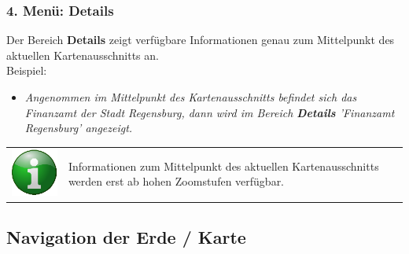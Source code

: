 \documentclass[10pt]{scrreprt}
\begin{document}
\subsubsection{4. Menü: Details} 
Der Bereich \textbf{Details} zeigt verfügbare Informationen genau zum Mittelpunkt des aktuellen Kartenausschnitts an.\\

Beispiel:
\begin{itemize}
\item \textit{Angenommen im Mittelpunkt des Kartenausschnitts befindet sich das Finanzamt der Stadt Regensburg, dann wird im Bereich \textbf{Details} 'Finanzamt Regensburg' angezeigt.}
\end{itemize}

\vspace{3mm}
\begin{tabular}{>{\centering \arraybackslash}m{1cm} m{14cm}}
\includegraphics[scale=0.5]{images/info.eps} & Informationen zum Mittelpunkt des aktuellen Kartenausschnitts werden erst ab hohen Zoomstufen verfügbar.
\end{tabular}





\newpage
\vspace{3mm}
\subsection{Navigation der Erde / Karte}

\vspace{3mm}
\end{document}
